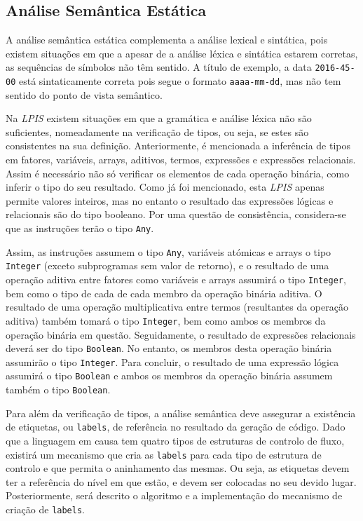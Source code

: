 \subsection{Análise Semântica Estática}
\label{subsec:semantica:desenho}

A análise semântica estática complementa a análise lexical e sintática, pois
existem situações em que a apesar de a análise léxica e sintática estarem
corretas, as sequências de símbolos não têm sentido. A título de exemplo, a data
\texttt{2016-45-00} está sintaticamente correta pois segue o formato
\texttt{aaaa-mm-dd}, mas não tem sentido do ponto de vista semântico.

Na \emph{LPIS} existem situações em que a gramática e análise léxica não são
suficientes, nomeadamente na verificação de tipos, ou seja, se estes são
consistentes na sua definição.  Anteriormente, é mencionada a inferência de
tipos em fatores, variáveis, arrays, aditivos, termos, expressões e expressões
relacionais. Assim é necessário não só verificar os elementos de cada operação
binária, como inferir o tipo do seu resultado.  Como já foi mencionado, esta
\emph{LPIS} apenas permite valores inteiros, mas no entanto o resultado das
expressões lógicas e relacionais são do tipo booleano. Por uma questão de
consistência, considera-se que as instruções terão o tipo \texttt{Any}.

Assim, as instruções assumem o tipo \texttt{Any}, variáveis atómicas e arrays
o tipo \texttt{Integer} (exceto subprogramas sem valor de retorno),
e o resultado de uma operação aditiva entre fatores como variáveis e arrays
assumirá o tipo \texttt{Integer}, bem como o tipo de cada de cada membro da
operação binária aditiva. O resultado de uma operação multiplicativa entre
termos (resultantes da operação aditiva) também tomará o tipo \texttt{Integer},
bem como ambos os membros da operação binária em questão. Seguidamente,
o resultado de expressões relacionais deverá ser do tipo \texttt{Boolean}. No
entanto, os membros desta operação binária assumirão o tipo \texttt{Integer}.
Para concluir, o resultado de uma expressão lógica assumirá o tipo
\texttt{Boolean} e ambos os membros da operação binária assumem também o tipo
\texttt{Boolean}.

Para além da verificação de tipos, a análise semântica deve assegurar
a existência de etiquetas, ou \texttt{labels}, de referência no resultado da
geração de código. Dado que a linguagem em causa tem quatro tipos de estruturas
de controlo de fluxo, existirá um mecanismo que cria as \texttt{labels} para
cada tipo de estrutura de controlo e que permita o aninhamento das mesmas. Ou
seja, as etiquetas devem ter a referência do nível em que estão, e devem ser
colocadas no seu devido lugar.  Posteriormente, será descrito o algoritmo
e a implementação do mecanismo de criação de \texttt{labels}.

